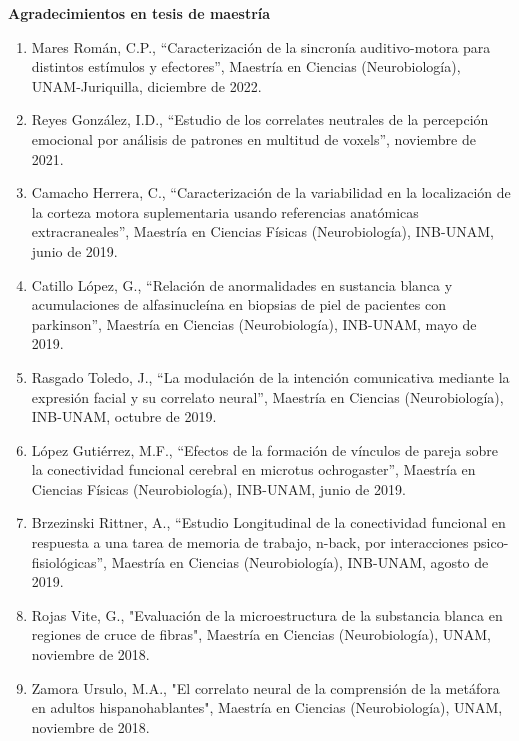 \textbf{\color{red}Agradecimientos en tesis de maestría}

\begin{enumerate}
\item Mares Román, C.P., “Caracterización de la sincronía auditivo-motora para distintos estímulos y efectores”, Maestría en Ciencias (Neurobiología), 
UNAM-Juriquilla,   diciembre de 2022.

\item Reyes González, I.D., “Estudio de los correlates neutrales de la percepción emocional por análisis de patrones en multitud de voxels”,   noviembre de 
2021.

\item Camacho Herrera, C., “Caracterización de la variabilidad en la localización de la corteza motora suplementaria usando referencias anatómicas 
extracraneales”, Maestría en Ciencias Físicas (Neurobiología), INB-UNAM,   junio de 2019.

\item Catillo López, G., “Relación de anormalidades en sustancia blanca y acumulaciones de alfasinucleína en biopsias de piel de pacientes con parkinson”, 
Maestría en Ciencias (Neurobiología), INB-UNAM,   mayo de 2019.

\item Rasgado Toledo, J., “La modulación de la intención comunicativa mediante la expresión facial y su correlato neural”, Maestría en Ciencias 
(Neurobiología), 
INB-UNAM,   octubre de 2019.

\item López Gutiérrez, M.F., “Efectos de la formación de vínculos de pareja sobre la conectividad funcional cerebral en microtus ochrogaster”, Maestría en 
Ciencias Físicas (Neurobiología), INB-UNAM,   junio de 2019.

\item Brzezinski Rittner, A., “Estudio Longitudinal de la conectividad funcional en respuesta a una tarea de memoria de trabajo, n-back, por interacciones 
psico-fisiológicas”, Maestría en Ciencias (Neurobiología), INB-UNAM,   agosto de 2019.

\item Rojas Vite, G., "Evaluación de la microestructura de la substancia blanca en regiones de cruce de fibras", Maestría en Ciencias (Neurobiología), UNAM,   
noviembre de 2018.

\item Zamora Ursulo, M.A., "El correlato neural de la comprensión de la metáfora en adultos hispanohablantes", Maestría en Ciencias (Neurobiología), UNAM,   
noviembre de 2018.


\end{enumerate}
